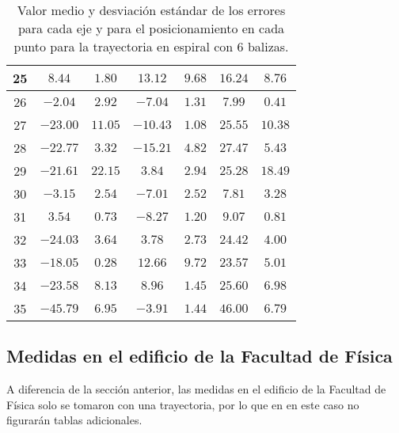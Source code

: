 \begin{table}[H]
\begin{tabular}{|c|c|c|c|c|c|c|}
                        25  &   $8.44$     &  $1.80$   &  $13.12$   &   $9.68$   &  $16.24$  &  $8.76$  \\ \hline
                        26  &   $-2.04$    &  $2.92$   &  $-7.04$   &   $1.31$   &  $7.99$   &  $0.41$  \\ \hline
                        27  &   $-23.00$   &  $11.05$  &  $-10.43$  &   $1.08$   &  $25.55$  &  $10.38$ \\ \hline
                        28  &   $-22.77$   &  $3.32$   &  $-15.21$  &   $4.82$   &  $27.47$  &  $5.43$  \\ \hline
                        29  &   $-21.61$   &  $22.15$  &  $3.84$    &   $2.94$   &  $25.28$  &  $18.49$ \\ \hline
                        30  &   $-3.15$    &  $2.54$   &  $-7.01$   &   $2.52$   &  $7.81$   &  $3.28$  \\ \hline
                        31  &   $3.54$     &  $0.73$   &  $-8.27$   &   $1.20$   &  $9.07$   &  $0.81$  \\ \hline
                        32  &   $-24.03$   &  $3.64$   &  $3.78$    &   $2.73$   &  $24.42$  &  $4.00$  \\ \hline
                        33  &   $-18.05$   &  $0.28$   &  $12.66$   &   $9.72$   &  $23.57$  &  $5.01$  \\ \hline
                        34  &   $-23.58$   &  $8.13$   &  $8.96$    &   $1.45$   &  $25.60$  &  $6.98$  \\ \hline
                        35  &   $-45.79$   &  $6.95$   &  $-3.91$   &   $1.44$   &  $46.00$  &  $6.79$  \\ \hline
        \end{tabular}
    \caption{Valor medio y desviación estándar de los errores para cada eje y para el posicionamiento en cada punto para la trayectoria en espiral con 6 balizas.}
    \label{tab:media_lab_6_espiral}
\end{table}

\newpage
\subsection*{Medidas en el edificio de la Facultad de Física}
A diferencia de la sección anterior, las medidas en el edificio de la Facultad de Física solo se tomaron con una trayectoria, por lo que en en este caso no figurarán tablas adicionales.

